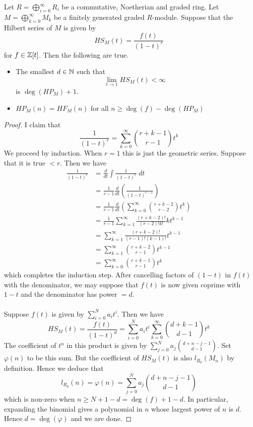 \documentclass[a4paper]{article}
\begin{document}
\begin{lmm}{}{} Let $R=\bigoplus_{i=0}^\infty R_i$ be a commutative, Noetherian and graded ring. Let $M=\bigoplus_{k=0}^\infty M_k$ be a finitely generated graded $R$-module. Suppose that the Hilbert series of $M$ is given by $$HS_M(t)=\frac{f(t)}{(1-t)^r}$$ for $f\in\mathbb{Z}[t]$. Then the following are true. 
\begin{itemize}
\item The smallest $d\in\mathbb{N}$ such that $$\lim_{t\to 1}HS_M(t)<\infty$$ is $\deg(HP_M)+1$. 
\item $HP_M(n)=HF_M(n)$ for all $n\geq\deg(f)-\deg(HP_M)$
\end{itemize} 
\begin{proof}
I claim that $$\frac{1}{(1-t)^r}=\sum_{k=0}^\infty\binom{r+k-1}{r-1}t^k$$ We proceed by induction. When $r=1$ this is just the geometric series. Suppose that it is true $<r$. Then we have 
\begin{align*}
\frac{1}{(1-t)^r}&=\frac{d}{dt}\int\frac{1}{(1-t)^r}\;dt\\
&=\frac{1}{r-1}\frac{d}{dt}\left(\frac{1}{(1-t)^{r-1}}\right)\\
&=\frac{1}{r-1}\frac{d}{dt}\left(\sum_{k=0}^\infty\binom{r+k-2}{r-2}t^k\right)\\
&=\frac{1}{r-1}\sum_{k=1}^\infty\frac{(r+k-2)!}{(r-2)!k!}kt^{k-1}\\
&=\sum_{k=1}^\infty\frac{(r+k-2)!}{(r-1)!(k-1)!}t^{k-1}\\
&=\sum_{k=1}^\infty\binom{r+k-2}{r-1}t^{k-1}\\
&=\sum_{k=0}^\infty\binom{r+k-1}{r-1}t^k
\end{align*}
which completes the induction step. After cancelling factors of $(1-t)$ in $f(t)$ with the denominator, we may suppose that $f(t)$ is now given coprime with $1-t$ and the denominator has power $=d$. \\~\\

Suppose $f(t)$ is given by $\sum_{i=0}^Na_it^i$. Then we have $$HS_M(t)=\frac{f(t)}{(1-t)^d}=\sum_{i=0}^Na_it^i\sum_{k=0}^\infty\binom{d+k-1}{d-1}t^k$$ The coefficient of $t^n$ in this product is given by $\sum_{j=0}^Na_j\binom{d+n-j-1}{d-1}$. Set $\varphi(n)$ to be this sum. But the coefficient of $HS_M(t)$ is also $l_{R_0}(M_n)$ by definition. Hence we deduce that $$l_{R_0}(n)=\varphi(n)=\sum_{j=0}^Na_j\binom{d+n-j-1}{d-1}$$ which is non-zero when $n\geq N+1-d=\deg(f)+1-d$. In particular, expanding the binomial gives a polynomial in $n$ whose largest power of $n$ is $d$. Hence $d=\deg(\varphi)$ and we are done. 
\end{proof}
\end{lmm}
\end{document}
